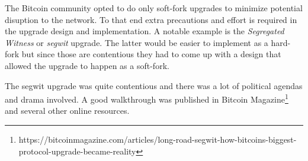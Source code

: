 \begin{note}
The Bitcoin community opted to do only soft-fork upgrades to minimize potential disuption to the network. To that end extra precautions and effort is required in the upgrade design and implementation. A notable example is the \emph{Segregated Witness} or \emph{segwit} upgrade. The latter would be easier to implement as a hard-fork but since those are contentious they had to come up with a design that allowed the upgrade to happen as a soft-fork. 
\end{note}

The segwit upgrade was quite contentious and there was a lot of political agendas and drama involved. A good walkthrough was published in Bitcoin Magazine\footnote{https://bitcoinmagazine.com/articles/long-road-segwit-how-bitcoins-biggest-protocol-upgrade-became-reality} and several other online resources.


